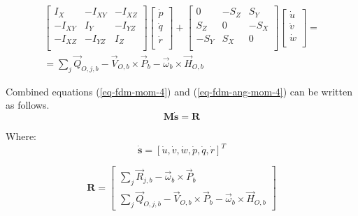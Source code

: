 \begin{multline}
  \label{eq-fdm-ang-mom-4}
    \left[
      \begin{matrix}
        I_X    & -I_{XY} & -I_{XZ} \\
        -I_{XY} &  I_Y    & -I_{YZ} \\
        -I_{XZ} & -I_{YZ} &  I_Z    \\
      \end{matrix}
    \right]
    \left[
      \begin{matrix}
        \dot p \\
        \dot q \\
        \dot r \\
      \end{matrix}
    \right]
    +
    \left[
      \begin{matrix}
          0 & -S_Z &  S_Y \\
        S_Z &    0 & -S_X \\
        -S_Y &  S_X &    0 \\
      \end{matrix}
    \right]
    \left[
      \begin{matrix}
        \dot u \\
        \dot v \\
        \dot w \\
      \end{matrix}
    \right]
    = \\ =
    \sum_j {\vec Q}_{O,j,b}
    -
    {\vec V}_{O,b} \times {\vec P}_b
    -
    {\vec \omega}_b \times {\vec H}_{O,b}
\end{multline}

Combined equations (\ref{eq-fdm-mom-4}) and (\ref{eq-fdm-ang-mom-4}) can be written as follows. \cite{Sibilski2004}
\begin{equation}
  \label{eq-fdm-motion-1}
  \boldsymbol M \dot {\boldsymbol s} = \boldsymbol R
\end{equation}

Where:
\begin{equation}
  \dot {\boldsymbol s}
  =
  \left[ \dot u, \dot v, \dot w, \dot p, \dot q, \dot r \right]^T
\end{equation}

\begin{equation}
  {\boldsymbol R}
  =
  \left[
    \begin{array}{c}
      \sum_{j} {\vec R}_{j,b} - {\vec \omega}_b \times {\vec P}_b \\
      \sum_{j} {\vec Q}_{O,j,b} - {\vec V}_{O,b} \times {\vec P}_b - {\vec \omega}_b \times {\vec H}_{O,b}
    \end{array}
  \right]
\end{equation}

